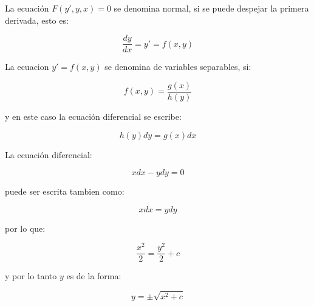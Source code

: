 		\begin{definicion}
			La ecuación $F(y', y, x) = 0$ se denomina normal, si se puede despejar la primera derivada, esto es:

			\begin{equation}
				\frac{dy}{dx} = y' = f(x, y)
			\end{equation}
		\end{definicion}

		\begin{definicion}
			La ecuacion $y' = f(x, y)$ se denomina de variables separables, si:

			\begin{equation}
				f(x, y) = \frac{g(x)}{h(y)}
			\end{equation}

			y en este caso la ecuación diferencial se escribe:

			\begin{equation}
				h(y) dy = g(x) dx
			\end{equation}
		\end{definicion}

		\begin{ejemplo}
			La ecuación diferencial:

			\begin{equation*}
				x dx - y dy = 0
			\end{equation*}

			puede ser escrita tambien como:

			\begin{equation*}
				x dx = y dy
			\end{equation*}

			por lo que:

			\begin{equation*}
				\frac{x^2}{2} = \frac{y^2}{2} + c
			\end{equation*}

			y por lo tanto $y$ es de la forma:

			\begin{equation*}
				y = \pm \sqrt{x^2 + c}
			\end{equation*}
		\end{ejemplo}

